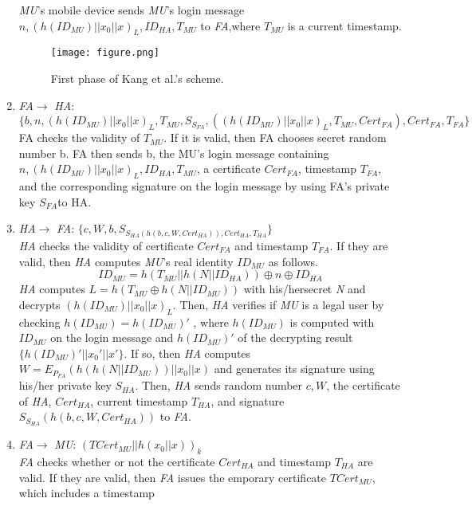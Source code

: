 \documentclass{article}
\begin{document}
\begin{enumerate}
    \emph{MU}'s mobile device sends \emph{MU}'s login message 
${n,(h({ID}_{MU})||x_0||x)_L,{ID}_{HA},T_{MU}}$ to \emph{FA},where \emph{$T_{MU}$} is a current 
timestamp.
\begin{figure}[htbp]
    \centering
    \texttt{[image: figure.png]}%
    \caption{First phase of Kang et al.'s scheme.}
    \end{figure}
\item \emph{FA}$\rightarrow$ \emph{HA}: 
$\{b,n,(h({ID}_{MU})||x_0||x)_L,T_{MU},{S}_{S_{FA}},((h({ID}_{MU})||x_0||x)_L,T_{MU},{Cert}_{FA}
),{Cert}_{FA},T_{FA}\}$\\
 FA checks the validity of $T_{MU}$. If it is valid, then FA chooses secret random number b. FA
 then sends b, the MU’s login message containing ${n,(h({ID}_{MU})||x_0||x)_L,{ID}_{HA}, T_{MU}}$, 
a certificate $Cert_{FA}$, timestamp $T_{FA}$, and the corresponding signature on the
 login message by using FA’s private key $S_{FA}$to HA.
\item \emph{HA}$\rightarrow$ \emph{FA}: $\{c,W,b,S_{S_{HA} 
(h(b,c,W,{Cert}_{HA})),{Cert}_{HA},T_{HA}}\}$\\
 \emph{ HA} checks the validity of certificate $Cert_{FA}$ and timestamp $T_{FA}$. If they are valid, then 
\emph{HA }computes \emph{MU}’s real identity ${ID}_{MU}$ as follows.
\begin{equation}
    ID_{MU} = h(T_{MU}||h(N|| ID_{HA}))\oplus n \oplus ID_{HA}
\end{equation} 
 \emph{HA} computes \emph{$L = h(T_{MU}\oplus h(N||{ID}_{MU}))$} with his/hersecret \emph{N} 
and decrypts $(h({ID}_{MU})||x_0||x)_L$. Then, \emph{HA } verifies if \emph{MU} is a legal user by 
checking \emph{$h({ID}_{MU}) =h({ID}_{MU})'$} , where $h({ID}_{MU})$ is computed with 
\emph{${ID}_{MU}$} on the login message and $h({ID}_{MU})'$ of the decrypting result 
$\{h({ID}_{MU})'||{x_0}'||x'\}$. If so, then \emph{HA} computes $W 
=E_{P_{FA}}(h(h(N||{ID}_{MU}))||x_0||x)$ and generates its signature using his/her private key $S_{HA}$. 
Then, \emph{HA} sends random number $c, W$, the certificate of \emph{HA}, ${Cert}_{HA}$, current 
timestamp $T_{HA}$, and signature $S_{S_{HA}} (h(b,c,W,{Cert}_{HA}))$ to \emph{FA}.
\item \emph{FA}$\rightarrow$ \emph{MU}: $(T{Cert}_{MU}||h(x_0||x))_k$\\
 \emph{FA} checks whether or not the certificate ${Cert}_{HA}$ and timestamp $T_{HA}$ are valid. If 
they are valid, then \emph{FA} issues the emporary certificate $T{Cert}_{MU}$, which includes a timestamp 

\end{enumerate}
\end{document}
